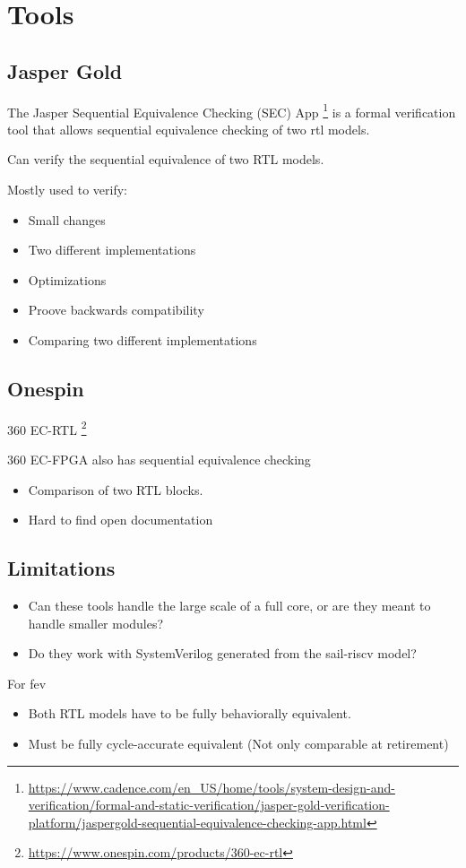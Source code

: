 \section{Tools}

\subsection{Jasper Gold}
The Jasper Sequential Equivalence Checking (SEC) App \footnote{\url{https://www.cadence.com/en_US/home/tools/system-design-and-verification/formal-and-static-verification/jasper-gold-verification-platform/jaspergold-sequential-equivalence-checking-app.html}}
is a formal verification tool that allows sequential equivalence checking of two \acrshort{rtl} models.

Can verify the sequential equivalence of two RTL models.

Mostly used to verify:
\begin{itemize}
    \item Small changes
    \item Two different implementations
    \item Optimizations
    \item Proove backwards compatibility
    \item Comparing two different implementations
\end{itemize}

\subsection{Onespin}


360 EC-RTL \footnote{\url{https://www.onespin.com/products/360-ec-rtl}}

360 EC-FPGA also has sequential equivalence checking

\begin{itemize}
    \item Comparison of two RTL blocks.
    \item Hard to find open documentation
\end{itemize}


\subsection{Limitations}

\begin{itemize}
    \item Can these tools handle the large scale of a full core, or are they meant to handle smaller modules?
    \item Do they work with SystemVerilog generated from the sail-riscv model?
\end{itemize}

For \acrshort{fev}
\begin{itemize}
    \item Both RTL models have to be fully behaviorally equivalent.
    \item Must be fully cycle-accurate equivalent (Not only comparable at retirement)
\end{itemize}
